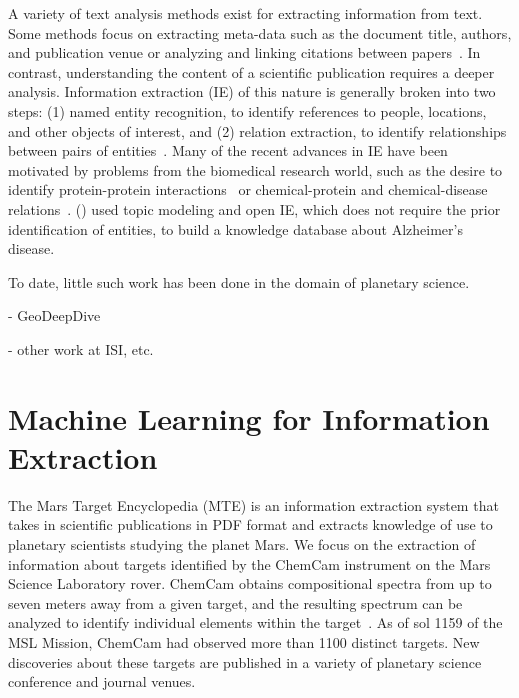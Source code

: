 \documentclass[letterpaper]{article} %
\begin{document}
A variety of text analysis methods exist for extracting information
from text.  Some methods focus on extracting meta-data such as the
document title, authors, and publication venue or analyzing and
linking citations between papers~\cite{ronzano:scipub16}.
%
In contrast, understanding the content of a scientific publication
requires a deeper analysis.  Information extraction (IE) of this
nature is generally broken into two steps: (1) named entity
recognition, to identify references to people, locations, and other
objects of interest, and (2) relation extraction, to identify
relationships between pairs of entities~\cite{mooney:ie05}.  Many of
the recent advances in IE have been motivated by problems from the
biomedical research world, such as the desire to identify
protein-protein interactions~\cite{tikk:protein10,bui:protein11} or
chemical-protein and chemical-disease
relations~\cite{krallinger:chemistry17}.  \citeauthor{tsutsui:ad16}
(\citeyear{tsutsui:ad16}) used topic modeling and open IE, which does
not require the prior identification of entities, to build a knowledge
database about Alzheimer's disease.

To date, little such work has been done in the domain of planetary
science. 

- GeoDeepDive

- other work at ISI, etc.

\section{Machine Learning for Information Extraction}

The Mars Target Encyclopedia (MTE) is an information extraction system
that takes in scientific publications in PDF format and extracts
knowledge of use to planetary scientists studying the planet Mars.
%
We focus on the extraction of information about targets identified by
the ChemCam instrument on the Mars Science Laboratory rover.  ChemCam
obtains compositional spectra from up to seven meters away from a
given target, and the resulting spectrum can be analyzed to identify
individual elements within the target~\cite{maurice:chemcam12}.  As of
sol 1159 of the MSL Mission, ChemCam had observed more than 1100
distinct targets.  New discoveries about these targets are published
in a variety of planetary science conference and journal venues.  
\end{document}

